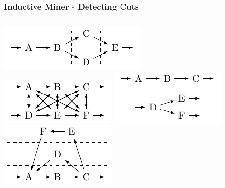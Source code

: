 \documentclass{beamer}
\begin{document}
\begin{frame}
\frametitle{Inductive Miner - Detecting Cuts}
\begin{columns}
\centering
\includegraphics[width=0.8\linewidth]{img/seq_cut.pdf}\\
\vspace{1cm}
\includegraphics[width=0.7\linewidth]{img/and_cut.pdf}
\includegraphics[width=0.7\linewidth]{img/xor_cut.pdf}\\
\vspace{1cm}
\includegraphics[width=0.7\linewidth]{img/loop_cut.pdf}
\end{columns}
\end{frame}
\end{document}
